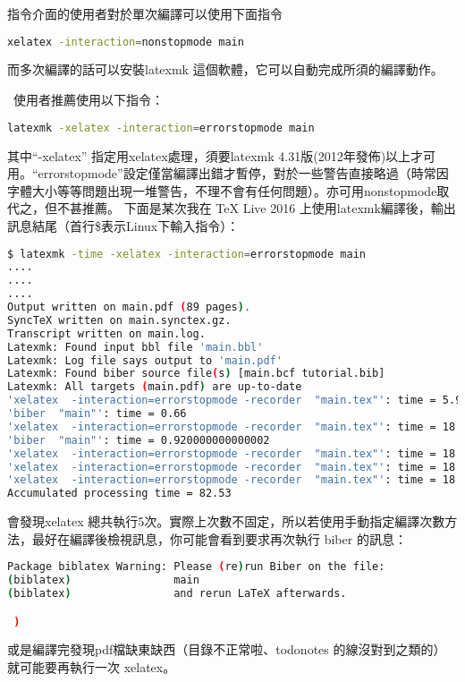 \documentclass[class=NCU_thesis, crop=false, float=true]{standalone}
\begin{document}
指令介面的使用者對於單次編譯可以使用下面指令
\begin{lstlisting}[style=consoleStyle,language=bash]
xelatex -interaction=nonstopmode main
\end{lstlisting}

而多次編譯的話可以安裝latexmk 這個軟體，它可以自動完成所須的編譯動作。

\XeLaTeX\ 使用者推薦使用以下指令：\\
\begin{lstlisting}[style=consoleStyle,language=bash]
latexmk -xelatex -interaction=errorstopmode main
\end{lstlisting}
其中``-xelatex'' 指定用xelatex處理，須要latexmk 4.31版(2012年發佈)以上才可用。``errorstopmode''設定僅當編譯出錯才暫停，對於一些警告直接略過（時常因字體大小等等問題出現一堆警告，不理不會有任何問題）。亦可用nonstopmode取代之，但不甚推薦。
下面是某次我在 TeX Live 2016 上使用latexmk編譯後，輸出訊息結尾（首行\$表示Linux下輸入指令）：
\begin{lstlisting}[style=consoleStyle,language=bash]
$ latexmk -time -xelatex -interaction=errorstopmode main
....
....
....
Output written on main.pdf (89 pages).
SyncTeX written on main.synctex.gz.
Transcript written on main.log.
Latexmk: Found input bbl file 'main.bbl'
Latexmk: Log file says output to 'main.pdf'
Latexmk: Found biber source file(s) [main.bcf tutorial.bib]
Latexmk: All targets (main.pdf) are up-to-date
'xelatex  -interaction=errorstopmode -recorder  "main.tex"': time = 5.92
'biber  "main"': time = 0.66
'xelatex  -interaction=errorstopmode -recorder  "main.tex"': time = 18.36
'biber  "main"': time = 0.920000000000002
'xelatex  -interaction=errorstopmode -recorder  "main.tex"': time = 18.01
'xelatex  -interaction=errorstopmode -recorder  "main.tex"': time = 18.2
'xelatex  -interaction=errorstopmode -recorder  "main.tex"': time = 18.09
Accumulated processing time = 82.53
\end{lstlisting}
會發現xelatex 總共執行5次。實際上次數不固定，所以若使用手動指定編譯次數方法，最好在編譯後檢視訊息，你可能會看到要求再次執行 biber 的訊息：
\begin{lstlisting}[style=consoleStyle,language=bash]
Package biblatex Warning: Please (re)run Biber on the file:
(biblatex)                main
(biblatex)                and rerun LaTeX afterwards.

 )
\end{lstlisting}
或是編譯完發現pdf檔缺東缺西（目錄不正常啦、todonotes 的線沒對到之類的）就可能要再執行一次 xelatex。
\end{document}
